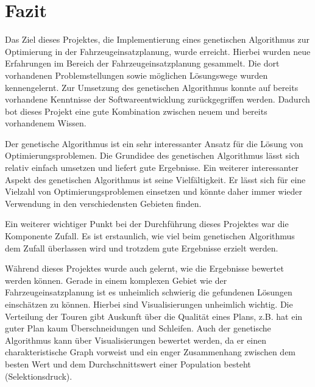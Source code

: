 \section{Fazit}
Das Ziel dieses Projektes, die Implementierung eines genetischen Algorithmus zur Optimierung in der Fahrzeugeinsatzplanung, wurde erreicht. Hierbei wurden neue Erfahrungen im Bereich der Fahrzeugeinsatzplanung gesammelt. Die dort vorhandenen Problemstellungen sowie möglichen Lösungswege wurden kennengelernt. Zur Umsetzung des genetischen Algorithmus konnte auf bereits vorhandene Kenntnisse der Softwareentwicklung zurückgegriffen werden. Dadurch bot dieses Projekt eine gute Kombination zwischen neuem und bereits vorhandenem Wissen.

Der genetische Algorithmus ist ein sehr interessanter Ansatz für die Lösung von Optimierungsproblemen. Die Grundidee des genetischen Algorithmus lässt sich relativ einfach umsetzen und liefert gute Ergebnisse. Ein weiterer interessanter Aspekt des genetischen Algorithmus ist seine Vielfältigkeit. Er lässt sich für eine Vielzahl von Optimierungsproblemen einsetzen und könnte daher immer wieder Verwendung in den verschiedensten Gebieten finden.

Ein weiterer wichtiger Punkt bei der Durchführung dieses Projektes war die Komponente Zufall. Es ist erstaunlich, wie viel beim genetischen Algorithmus dem Zufall überlassen wird und trotzdem gute Ergebnisse erzielt werden. 

Während dieses Projektes wurde auch gelernt, wie die Ergebnisse bewertet werden können. Gerade in einem komplexen Gebiet wie der Fahrzeugeinsatzplanung ist es unheimlich schwierig die gefundenen Lösungen einschätzen zu können. Hierbei sind Visualisierungen unheimlich wichtig. Die Verteilung der Touren gibt Auskunft über die Qualität eines Plans, z.B. hat ein guter Plan kaum Überschneidungen und Schleifen. Auch der genetische Algorithmus kann über Visualisierungen bewertet werden, da er einen charakteristische Graph vorweist und ein enger Zusammenhang zwischen dem besten Wert und dem Durchschnittswert einer Population besteht (Selektionsdruck).
